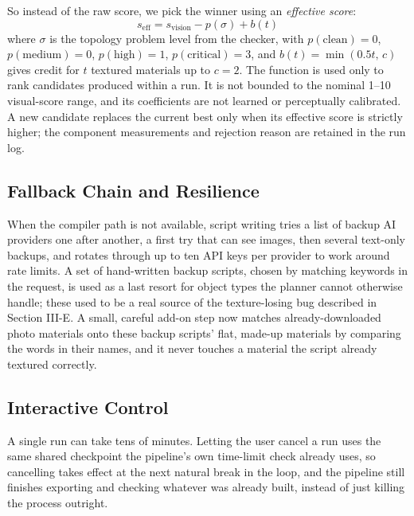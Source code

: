 \documentclass[conference]{IEEEtran}
\begin{document}
So instead of the raw score, we pick the winner using an \emph{effective score}:
\begin{equation}
s_{\mathrm{eff}} = s_{\mathrm{vision}} - p(\sigma) + b(t)
\label{eq:effscore}
\end{equation}
where $\sigma$ is the topology problem level from the checker, with $p(\text{clean})=0$, $p(\text{medium})=0$, $p(\text{high})=1$, $p(\text{critical})=3$, and $b(t)=\min(0.5t,\,c)$ gives credit for $t$ textured materials up to $c=2$. The function is used only to rank candidates produced within a run. It is not bounded to the nominal 1--10 visual-score range, and its coefficients are not learned or perceptually calibrated. A new candidate replaces the current best only when its effective score is strictly higher; the component measurements and rejection reason are retained in the run log.

\subsection{Fallback Chain and Resilience}
When the compiler path is not available, script writing tries a list of backup AI providers one after another, a first try that can see images, then several text-only backups, and rotates through up to ten API keys per provider to work around rate limits. A set of hand-written backup scripts, chosen by matching keywords in the request, is used as a last resort for object types the planner cannot otherwise handle; these used to be a real source of the texture-losing bug described in Section III-E. A small, careful add-on step now matches already-downloaded photo materials onto these backup scripts' flat, made-up materials by comparing the words in their names, and it never touches a material the script already textured correctly.

\subsection{Interactive Control}
A single run can take tens of minutes. Letting the user cancel a run uses the same shared checkpoint the pipeline's own time-limit check already uses, so cancelling takes effect at the next natural break in the loop, and the pipeline still finishes exporting and checking whatever was already built, instead of just killing the process outright.
\end{document}
